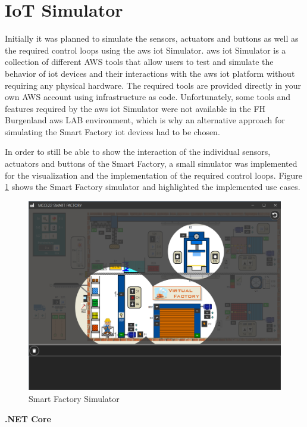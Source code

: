 \section{IoT Simulator}
Initially it was planned to simulate the sensors, actuators and buttons as well as the required control loops using the \ac{aws} \ac{iot} Simulator. 
\ac{aws} \ac{iot} Simulator is a collection of different AWS tools that allow users to test and simulate the behavior of \ac{iot} devices and their interactions with the \ac{aws} \ac{iot} platform without requiring any physical hardware. 
The required tools are provided directly in your own AWS account using infrastructure as code.
Unfortunately, some tools and features required by the \ac{aws} \ac{iot} Simulator were not available in the FH Burgenland \ac{aws} LAB environment, which is why an alternative approach for simulating the Smart Factory \ac{iot} devices had to be chosen.

In order to still be able to show the interaction of the individual sensors, actuators and buttons of the Smart Factory, a small simulator was implemented for the visualization and the implementation of the required control loops. 
Figure \ref{fig:SmartFactorySimulator} shows the Smart Factory simulator and highlighted the implemented use cases.

\begin{figure}[H]
	\centering
	\includegraphics[width=15cm]{images/smart_factory_simulator.png}
	\caption{Smart Factory Simulator}    
	\label{fig:SmartFactorySimulator}
\end{figure}

\textbf{.NET Core}

